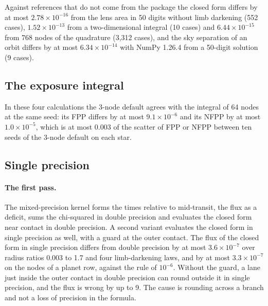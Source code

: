 \documentclass[11pt]{article}
\begin{document}
Against references that do not come from the package the closed form differs by at most $2.78\times10^{-16}$ from the lens area in 50 digits without limb darkening (552 cases), $1.52\times10^{-13}$ from a two-dimensional integral (10 cases) and $6.44\times10^{-15}$ from 768 nodes of the quadrature (3,312 cases), and the sky separation of an orbit differs by at most $6.34\times10^{-14}$ with NumPy 1.26.4 from a 50-digit solution (9 cases).

\subsection{The exposure integral}

In these four calculations the 3-node default agrees with the integral of 64 nodes at the same seed: its FPP differs by at most $9.1\times10^{-6}$ and its NFPP by at most $1.0\times10^{-5}$, which is at most 0.003 of the scatter of FPP or NFPP between ten seeds of the 3-node default on each star.

\subsection{Single precision}\label{sec:fp32}

\paragraph{The first pass.} The mixed-precision kernel forms the times relative to mid-transit, the flux as a deficit, sums the chi-squared in double precision and evaluates the closed form near contact in double precision. A second variant evaluates the closed form in single precision as well, with a guard at the outer contact. The flux of the closed form in single precision differs from double precision by at most $3.6\times10^{-7}$ over radius ratios 0.003 to 1.7 and four limb-darkening laws, and by at most $3.3\times10^{-7}$ on the nodes of a planet row, against the rule of $10^{-6}$. Without the guard, a lane just inside the outer contact in double precision can round outside it in single precision, and the flux is wrong by up to 9. The cause is rounding across a branch and not a loss of precision in the formula.
\end{document}
